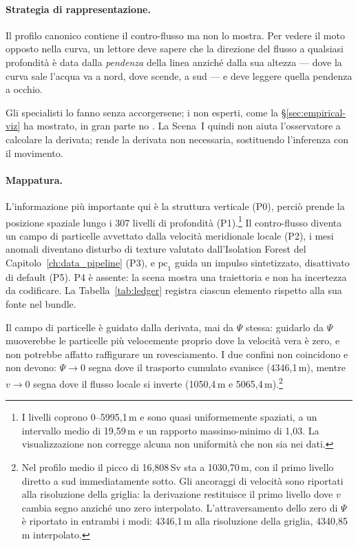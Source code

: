 \paragraph{Strategia di rappresentazione.} Il profilo canonico contiene il contro-flusso ma non lo mostra. Per vedere il moto opposto nella curva, un lettore deve sapere che la direzione del flusso a qualsiasi profondità è data dalla \emph{pendenza} della linea anziché dalla sua altezza --- dove la curva sale l'acqua va a nord, dove scende, a sud --- e deve leggere quella pendenza a occhio.

Gli specialisti lo fanno senza accorgersene; i non esperti, come la \S\ref{sec:empirical-viz} ha mostrato, in gran parte no \parencite{harold2016, mcmahon2015, fischer2020}. La Scena~I quindi non aiuta l'osservatore a calcolare la derivata; rende la derivata non necessaria, sostituendo l'inferenza con il movimento.

\paragraph{Mappatura.} L'informazione più importante qui è la struttura verticale (P0), perciò prende la posizione spaziale lungo i 307 livelli di profondità (P1).\footnote{I livelli coprono 0--5995,1\,m e sono quasi uniformemente spaziati, a un intervallo medio di 19,59\,m e un rapporto massimo-minimo di 1,03. La visualizzazione non corregge alcuna non uniformità che non sia nei dati.} Il contro-flusso diventa un campo di particelle avvettato dalla velocità meridionale locale (P2), i mesi anomali diventano disturbo di texture valutato dall'Isolation Forest del Capitolo~\ref{ch:data_pipeline} (P3), e $\mathrm{pc}_1$ guida un impulso sintetizzato, disattivato di default (P5). P4 è assente: la scena mostra una traiettoria e non ha incertezza da codificare. La Tabella~\ref{tab:ledger} registra ciascun elemento rispetto alla sua fonte nel bundle.

Il campo di particelle è guidato dalla derivata, mai da $\Psi$ stessa: guidarlo da $\Psi$ muoverebbe le particelle più velocemente proprio dove la velocità vera è zero, e non potrebbe affatto raffigurare un rovesciamento. I due confini non coincidono e non devono: $\Psi \to 0$ segna dove il trasporto cumulato svanisce (4346,1\,m), mentre $v \to 0$ segna dove il flusso locale si inverte (1050,4\,m e 5065,4\,m).\footnote{Nel profilo medio il picco di 16,808\,Sv sta a 1030,70\,m, con il primo livello diretto a sud immediatamente sotto. Gli ancoraggi di velocità sono riportati alla risoluzione della griglia: la derivazione restituisce il primo livello dove $v$ cambia segno anziché uno zero interpolato. L'attraversamento dello zero di $\Psi$ è riportato in entrambi i modi: 4346,1\,m alla risoluzione della griglia, 4340,85\,m interpolato.}

